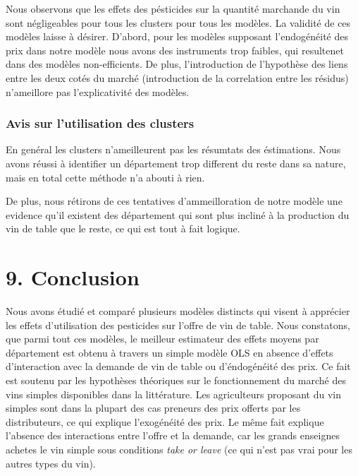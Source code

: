 \documentclass[11pt,]{article}
\begin{document}
\FloatBarrier

Nous observons que les effets des pésticides sur la quantité marchande
du vin sont négligeables pour tous les clusters pour tous les modèles.
La validité de ces modèles laisse à désirer. D'abord, pour les modèles
supposant l'endogénéité des prix dans notre modèle nous avons des
instruments trop faibles, qui resultenet dans des modèles
non-efficients. De plus, l'introduction de l'hypothèse des liens entre
les deux cotés du marché (introduction de la correlation entre les
résidus) n'ameillore pas l'explicativité des modèles.

\hypertarget{avis-sur-lutilisation-des-clusters}{%
\subsubsection{Avis sur l'utilisation des
clusters}\label{avis-sur-lutilisation-des-clusters}}

En genéral les clusters n'ameilleurent pas les résumtats des
éstimations. Nous avons réussi à identifier un département trop
different du reste dans sa nature, mais en total cette méthode n'a
abouti à rien.

De plus, nous rétirons de ces tentatives d'ammeilloration de notre
modèle une evidence qu'il existent des département qui sont plus incliné
à la production du vin de table que le reste, ce qui est tout à fait
logique.

\hypertarget{conclusion}{%
\section{9. Conclusion}\label{conclusion}}

Nous avons étudié et comparé plusieurs modèles distincts qui visent à
apprécier les effets d'utilisation des pesticides sur l'offre de vin de
table. Nous constatons, que parmi tout ces modèles, le meilleur
estimateur des effets moyens par département est obtenu à travers un
simple modèle OLS en absence d'effets d'interaction avec la demande de
vin de table ou d'éndogénéité des prix. Ce fait est soutenu par les
hypothèses théoriques sur le fonctionnement du marché des vins simples
disponibles dans la littérature. Les agriculteurs proposant du vin
simples sont dans la plupart des cas preneurs des prix offerts par les
distributeurs, ce qui explique l'exogénéité des prix. Le même fait
explique l'absence des interactions entre l'offre et la demande, car les
grands enseignes achetes le vin simple sous conditions \emph{take or
leave} (ce qui n'est pas vrai pour les autres types du vin).
\end{document}
